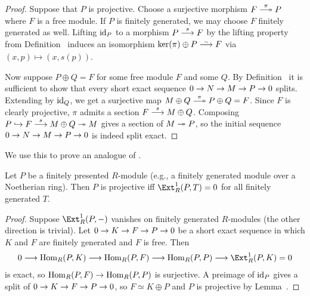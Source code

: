 \documentclass[a4paper,parskip=half,numbers=enddot, DIV=12]{scrreprt}
\begin{document}
\begin{proof}
	Suppose that $P$ is projective. Choose a surjective morphism $F\epimorphism[\pi]P$ where $F$ is a free module. If $P$ is finitely generated, we may choose $F$ finitely generated as well. Lifting $\operatorname{id}_P$ to a morphism $P\morphism[s]F$ by the lifting property from Definition~ induces an isomorphism $\ker(\pi)\oplus P\isomorphism F$ via $(x,p)\mapsto (x,s(p))$.
	
	Now suppose $P\oplus Q=F$ for some free module $F$ and some $Q$. By Definition~ it is sufficient to show that every short exact sequence $0\morphism N\morphism M\morphism P\morphism 0$ splits. Extending by $\operatorname{id}_Q$, we get a surjective map $M\oplus Q\epimorphism[\pi] P\oplus Q=F$. Since $F$ is clearly projective, $\pi$ admits a section $F\morphism[s]M\oplus Q$. Composing $P\monomorphism F\morphism[s]M\oplus Q\epimorphism M$ gives a section of $M\epimorphism P$, so the initial sequence $0\morphism N\morphism M\morphism P\morphism 0$ is indeed split exact.
\end{proof}
We use this to prove an analogue of .
\begin{cor}
	Let $P$ be a finitely presented $R$-module (e.g., a finitely generated module over a Noetherian ring). Then $P$ is projective iff $\Ext_R^1(P,T)=0$ for all finitely generated $T$.
\end{cor}
\begin{proof}
	Suppose $\Ext_R^1(P,-)$ vanishes on finitely generated $R$-modules (the other direction is trivial). Let $0\morphism K\morphism F\morphism P\morphism 0$ be a short exact sequence in which $K$ and $F$ are finitely generated and $F$ is free. Then 
	\begin{align*}
		0\morphism\Hom_R(P,K)\morphism\Hom_R(P,F)\morphism\Hom_R(P,P)\morphism\Ext_R^1(P,K)=0
	\end{align*}
	is exact, so $\Hom_R(P,F)\morphism\Hom_R(P,P)$ is surjective. A preimage of $\operatorname{id}_P$ gives a split of $0\morphism K\morphism F\morphism P\morphism 0$, so $F\simeq K\oplus P$ and $P$ is projective by Lemma~.
\end{proof}
\end{document}
